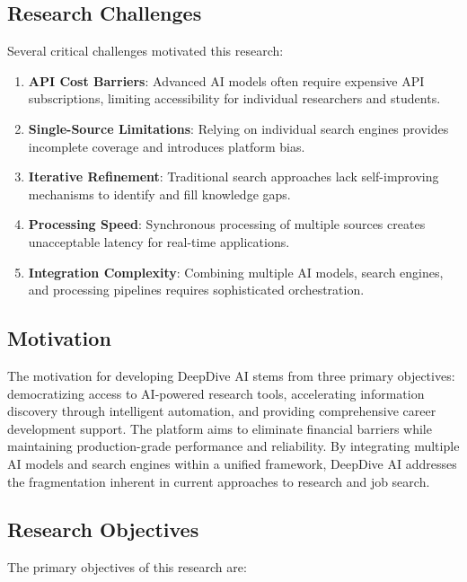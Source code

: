 \documentclass[conference]{IEEEtran}
\begin{document}
\subsection{Research Challenges}
Several critical challenges motivated this research:

\begin{enumerate}
    \item \textbf{API Cost Barriers}: Advanced AI models often require expensive API subscriptions, limiting accessibility for individual researchers and students.
    \item \textbf{Single-Source Limitations}: Relying on individual search engines provides incomplete coverage and introduces platform bias.
    \item \textbf{Iterative Refinement}: Traditional search approaches lack self-improving mechanisms to identify and fill knowledge gaps.
    \item \textbf{Processing Speed}: Synchronous processing of multiple sources creates unacceptable latency for real-time applications.
    \item \textbf{Integration Complexity}: Combining multiple AI models, search engines, and processing pipelines requires sophisticated orchestration.
\end{enumerate}

\subsection{Motivation}
The motivation for developing DeepDive AI stems from three primary objectives: democratizing access to AI-powered research tools, accelerating information discovery through intelligent automation, and providing comprehensive career development support. The platform aims to eliminate financial barriers while maintaining production-grade performance and reliability. By integrating multiple AI models and search engines within a unified framework, DeepDive AI addresses the fragmentation inherent in current approaches to research and job search.

\subsection{Research Objectives}
The primary objectives of this research are:
\end{document}
